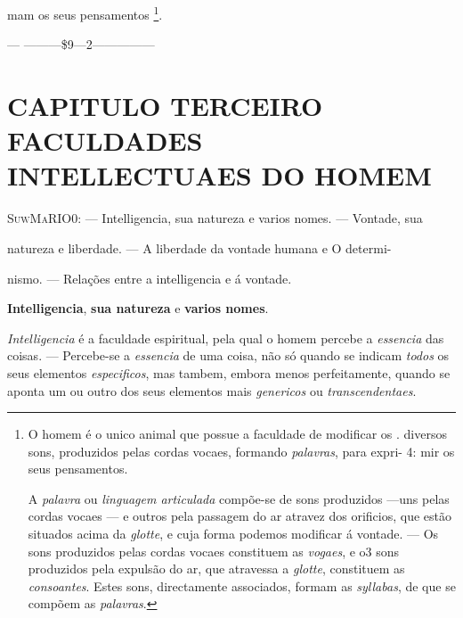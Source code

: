 mam os seus pensamentos \footnote{O homem é o unico animal que possue a faculdade de modificar os . \textbar{} diversos sons, produzidos pelas cordas vocaes, formando \emph{palavras}, para expri- 4: mir os seus pensamentos.\par A \emph{palavra} ou \emph{linguagem articulada} compõe-se de sons produzidos ---uns pelas cordas vocaes --- e outros pela passagem do ar atravez dos orificios, que estão situados acima da \emph{glotte}, e cuja forma podemos modificar á vontade. --- Os sons produzidos pelas cordas vocaes constituem as \emph{vogaes}, e o3 sons produzidos pela expulsão do ar, que atravessa a \emph{glotte}, constituem as \emph{consoantes}. Estes sons, directamente associados, formam as \emph{syllabas}, de que se compõem as \emph{palavras}.}.

--- ---------\$9---2---------------


\chapter*{CAPITULO TERCEIRO\\[0.3em]\large FACULDADES INTELLECTUAES DO HOMEM}

\textsc{SuwMaRIO}0: --- Intelligencia, sua natureza e varios nomes. --- Vontade, sua

natureza e liberdade. --- A liberdade da vontade humana e O determi-

nismo. --- Relações entre a intelligencia e á vontade.

\textbf{Intelligencia}, \textbf{sua natureza} e \textbf{varios nomes}.


\emph{Intelligencia} é a faculdade espiritual, pela qual o homem percebe a \emph{essencia} das coisas. --- Percebe-se a \emph{essencia} de uma coisa, não só quando se indicam \emph{todos}   os seus elementos \emph{especificos}, mas tambem, embora menos perfeitamente, quando se aponta um ou outro dos seus elementos mais \emph{genericos} ou \emph{transcendentaes}.

